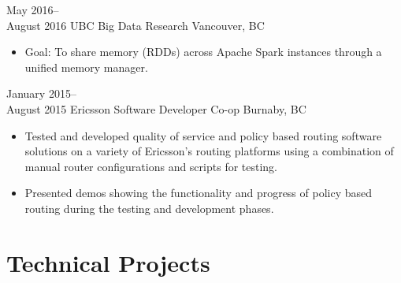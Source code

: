 \documentclass[]{friggeri-cv} %
\begin{document}
\begin{entrylist}

\entry
{May 2016--\\August 2016}
{UBC {\normalfont Big Data Research}}
{Vancouver, BC}
{
\begin{itemize}
\item Goal: To share memory (RDDs) across Apache Spark instances through a
unified memory manager.
\end{itemize}
}
\entry
{January 2015--\\August 2015}
{Ericsson {\normalfont Software Developer Co-op}}
{Burnaby, BC}
{
\begin{itemize}
\item Tested and developed quality of service and policy based routing software
solutions on a variety of Ericsson's routing platforms using a combination of
manual router configurations and scripts for testing.
\item Presented demos showing the functionality and progress of policy based
routing during the testing and development phases.
\end{itemize}
}
\end{entrylist}

\section{Technical Projects}
\end{document}
